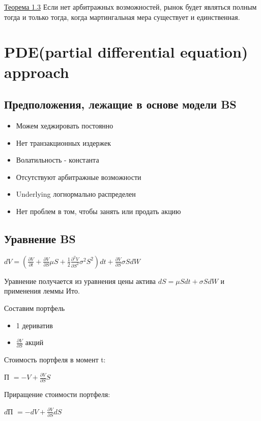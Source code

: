 \documentclass{article}
\begin{document}
 \underline{Теорема 1.3} Если нет арбитражных возможностей, рынок будет являться полным тогда и только тогда, когда мартингальная мера существует и единственная.
 \section{PDE(partial differential equation) approach}
 \subsection{Предположения, лежащие в основе модели BS}
 \begin{itemize}
     \item Можем хеджировать постоянно
     \item Нет транзакционных издержек
     \item Волатильность - константа
     \item Отсутствуют арбитражные возможности
     \item Underlying логнормально распределен
     \item Нет проблем в том, чтобы занять или продать акцию
 \end{itemize} 
\subsection{Уравнение BS}
\(dV = (\frac{\partial V}{\partial t} + \frac{\partial V}{\partial S}\mu S + \frac{1}{2} \frac{\partial^2 V}{\partial S^2}\sigma^2 S^2)dt + \frac{\partial V}{\partial S}\sigma SdW\)
\newline

Уравнение получается из уравнения цены актива \(dS = \mu Sdt+\sigma SdW\) и применения леммы Ито.
\newline

Составим портфель
 \begin{itemize}
     \item 1 дериватив
     \item \(\frac{\partial V}{\partial S}\) акций
 \end{itemize} 

Стоимость портфеля в момент t:
\newline

П \( =-V + \frac{\partial V}{\partial S}S\)
\newline

Приращение стоимости портфеля:
\newline

$d$П \( =-dV + \frac{\partial V}{\partial S}dS\)
\newline
\end{document}
